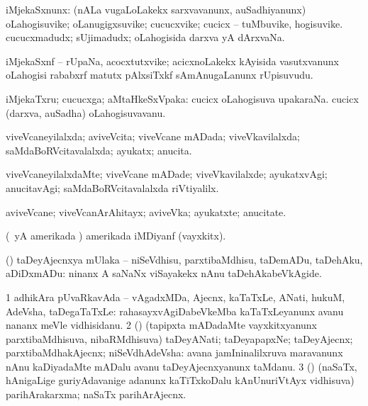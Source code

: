 \bentry
{}
\gl{\nA}
\bmng
iMjekaSxnunx: 
\banum
{} (nALa \mo vugaLoLakekx sarxvavanunx, auSadhiyanunx) oLahogisuvike; oLanugigxsuvike; cucucxvike; cucicx -- tuMbuvike, hogisuvike. 
 cucucxmadudx; sUjimadudx; oLahogisida darxva yA dArxvaNa. 
\eanum
\emng
\eentry

\bentry
{}
\gl{\nA}
\bmng
iMjekaSxnf -- rUpaNa, acocxtutxvike; acicxnoLakekx kAyisida vasutxvanunx oLahogisi rababxrf matutx pAlxsiTxkf sAmAnugaLanunx rUpisuvudu. 
\emng
\eentry

\bentry
{}
\gl{\nA}
\bmng
iMjekaTxru; cucucxga; aMtaHkeSxVpaka: 
\banum
{} cucicx oLahogisuva upakaraNa. 
 cucicx (darxva, auSadha) oLahogisuvavanu. 
\eanum
\emng
\eentry

\bentry
{}
\gl{\gu}
\bmng
viveVcaneyilalxda; aviveVcita; viveVcane mADada; viveVkavilalxda; saMdaBoRVcitavalalxda; ayukatx; anucita. 
\emng
\eentry

\bentry
{}
\gl{\kirxvi}
\bmng
viveVcaneyilalxdaMte; viveVcane mADade; viveVkavilalxde; ayukatxvAgi; anucitavAgi; saMdaBoRVcitavalalxda riVtiyalilx. 
\emng
\eentry

\bentry
{}
\gl{\nA}
\bmng
aviveVcane; viveVcanArAhitayx; aviveVka; ayukatxte; anucitate. 
\emng
\eentry

\bentry
{}
\gl{\nA}
\bmng
(\AmA\ yA amerikada \pArxM) amerikada iMDiyanf (vayxkitx). 
\emng
\eentry

\bentry
{}
\gl{\sakirx}
\bmng
(\AmA) taDeyAjecnxya mUlaka -- niSeVdhisu, parxtibaMdhisu, taDemADu, taDehAku, aDiDxmADu:  ninanx A saNaNx viSayakekx nAnu taDehAkabeVkAgide. 
\emng
\eentry

\bentry
{}
\gl{\nA}
\bmng
\bnum
\num{1} adhikAra pUvaRkavAda -- vAgadxMDa, Ajecnx, kaTaTxLe, ANati, hukuM, AdeVsha, taDegaTaTxLe:  rahasayxvAgiDabeVkeMba kaTaTxLeyanunx avanu nananx meVle vidhisidanu. 
\num{2} (\nAyxshA) (tapipxta mADadaMte vayxkitxyanunx parxtibaMdhisuva, nibaRMdhisuva) taDeyANati; taDeyapapxNe; taDeyAjecnx; parxtibaMdhakAjecnx; niSeVdhAdeVsha:  avana jamIninalilxruva maravanunx nAnu kaDiyadaMte mADalu avanu taDeyAjecnxyanunx taMdanu. 
\num{3} (\nAyxshA) (naSaTx, hAnigaLige guriyAdavanige adanunx kaTiTxkoDalu kAnUnuriVtAyx vidhisuva) parihArakarxma; naSaTx parihArAjecnx. 
\enum
\emng
\eentry

